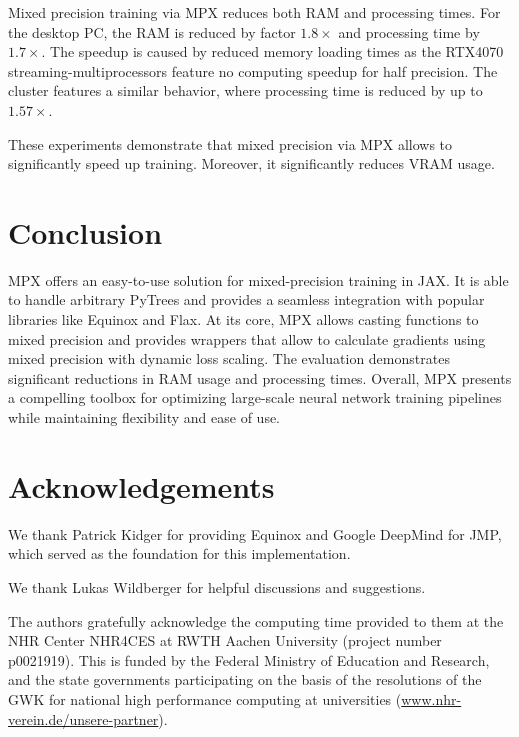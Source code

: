 \documentclass[copyright, logo]{dsme}
\newcommand{\mpx}{\textsc{MPX}}
\begin{document}
Mixed precision training via \mpx{} reduces both RAM and processing times.
For the desktop PC, the RAM is reduced by factor $1.8\times$ and processing time by $1.7\times$.
The speedup is caused by reduced memory loading times as the RTX4070 streaming-multiprocessors feature no computing speedup for half precision.
The cluster features a similar behavior, where processing time is reduced by up to $1.57\times$.

These experiments demonstrate that mixed precision via \mpx{} allows to significantly speed up training.
Moreover, it significantly reduces VRAM usage.


\section{Conclusion}

\mpx{} offers an easy-to-use solution for mixed-precision training in JAX.
It is able to handle arbitrary PyTrees and provides a seamless integration with popular libraries like Equinox and Flax. 
At its core, \mpx{} allows casting functions to mixed precision and provides wrappers that allow to calculate gradients using mixed precision with dynamic loss scaling.
The evaluation demonstrates significant reductions in RAM usage and processing times. 
Overall, MPX presents a compelling toolbox for optimizing large-scale neural network training pipelines while maintaining flexibility and ease of use.


\section{Acknowledgements}
We thank Patrick Kidger for providing Equinox and Google DeepMind for JMP, which served as the foundation for this implementation.

We thank Lukas Wildberger for helpful discussions and suggestions.

The authors gratefully acknowledge the computing time provided to them at the NHR Center NHR4CES at RWTH Aachen University (project number p0021919). This is funded by the Federal Ministry of Education and Research, and the state governments participating on the basis of the resolutions of the GWK for national high performance computing at universities (\url{www.nhr-verein.de/unsere-partner}).


\end{document}
